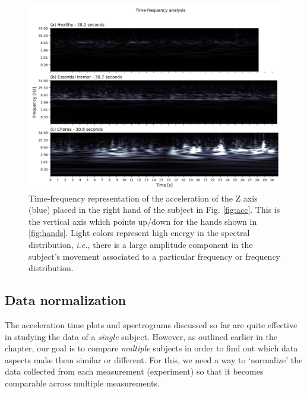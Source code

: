 
\begin{figure}[ht]
\centering
\includegraphics[width=\linewidth]{figures/nemo/freq2.png}
\caption{Time-frequency representation of the acceleration of the Z axis (blue) placed in the right hand of the subject in Fig. \ref{fig:acc}. This is the vertical axis which points up/down for the hands shown in \cref{fig:hands}. Light colors represent high energy in the spectral distribution, \emph{i.e.}, there is a large amplitude component in the subject's movement associated to a particular frequency or frequency distribution. 
}
\label{fig:freq}
\end{figure}

\subsection{Data normalization}
\label{sec:nemo_pipeline_datanorm}
%
The acceleration time plots and spectrograms discussed so far are quite effective in studying the data of a \emph{single} subject. However, as outlined earlier in the chapter, our goal is to compare \emph{multiple} subjects in order to find out which data aspects make them similar or different. For this, we need a way to `normalize' the data collected from each measurement (experiment) so that it becomes comparable across multiple measurements.

